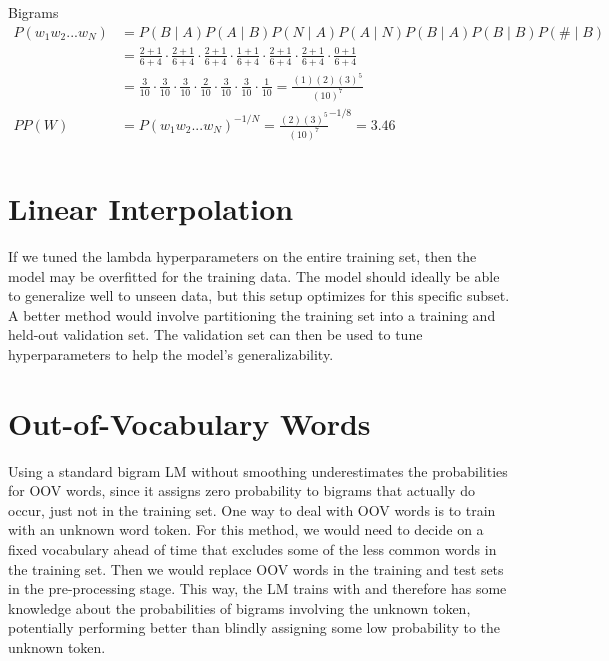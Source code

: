 \documentclass{article}
\begin{document}
Bigrams\\
\begin{align*}
  P(w_1w_2...w_N) &= P(B \mid A)P(A \mid B)P(N \mid A)P(A \mid N)P(B \mid A)P(B \mid B)P(\# \mid B) \\
  &= \frac{2 + 1}{6 + 4} \cdot \frac{2 + 1}{6 + 4} \cdot \frac{2 + 1}{6 + 4} \cdot \frac{1 + 1}{6 + 4} 
  \cdot \frac{2 + 1}{6 + 4} \cdot \frac{2 + 1}{6 + 4} \cdot \frac{0 + 1}{6 + 4} \\
  &= \frac{3}{10} \cdot \frac{3}{10} \cdot \frac{3}{10} \cdot \frac{2}{10} \cdot \frac{3}{10} \cdot \frac{3}{10} \cdot \frac{1}{10} = \frac{(1)(2)(3)^5}{(10)^7} \\
  PP(W) &= P(w_1w_2...w_N)^{-1/N} = \frac{(2)(3)^5}{(10)^7}^{-1/8} = 3.46\\
\end{align*}

\section{Linear Interpolation}
If we tuned the lambda hyperparameters on the entire training set, then the model may be overfitted for the training data. The model should ideally be able to generalize well to unseen data, but this setup optimizes for this specific subset. A better method would involve partitioning the training set into a training and held-out validation set. The validation set can then be used to tune hyperparameters to help the model's generalizability.

\section{Out-of-Vocabulary Words}
Using a standard bigram LM without smoothing underestimates the probabilities for OOV words, since it assigns zero probability to bigrams that actually do occur, just not in the training set. One way to deal with OOV words is to train with an unknown word token. For this method, we would need to decide on a fixed vocabulary ahead of time that excludes some of the less common words in the training set. Then we would replace OOV words in the training and test sets in the pre-processing stage. This way, the LM trains with and therefore has some knowledge about the probabilities of bigrams involving the unknown token, potentially performing better than blindly assigning some low probability to the unknown token.
\end{document}
